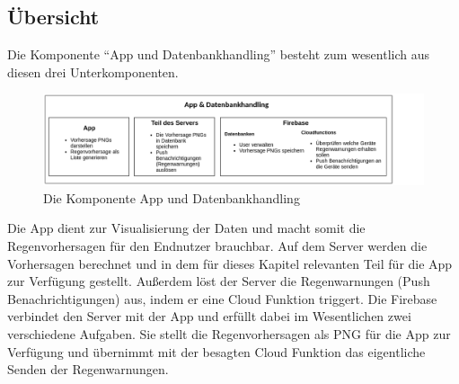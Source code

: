 \subsection{Übersicht}\label{übersicht}
Die Komponente “App und Datenbankhandling” besteht zum wesentlich aus diesen drei Unterkomponenten.  

\begin{figure}[h]
 \centering
 \includegraphics[width=1\textwidth,angle=0]{abb/KomponentenUebersicht.png}
 \caption[Komponentenübersicht App und Datenbankhandling]{Die Komponente App und Datenbankhandling}
\label{fig:Beschreibung}
\end{figure}

Die App dient zur Visualisierung der Daten und macht somit die Regenvorhersagen für den Endnutzer brauchbar. 
Auf dem Server werden die Vorhersagen berechnet und in dem für dieses Kapitel relevanten Teil
für die App zur Verfügung gestellt. 
Außerdem löst der Server die Regenwarnungen (Push Benachrichtigungen) aus, indem er eine Cloud Funktion triggert. 
Die Firebase verbindet den Server mit der App und erfüllt dabei im Wesentlichen zwei verschiedene Aufgaben. 
Sie stellt die Regenvorhersagen als PNG für die App zur Verfügung und übernimmt mit der besagten Cloud Funktion das eigentliche Senden der Regenwarnungen. 
 
